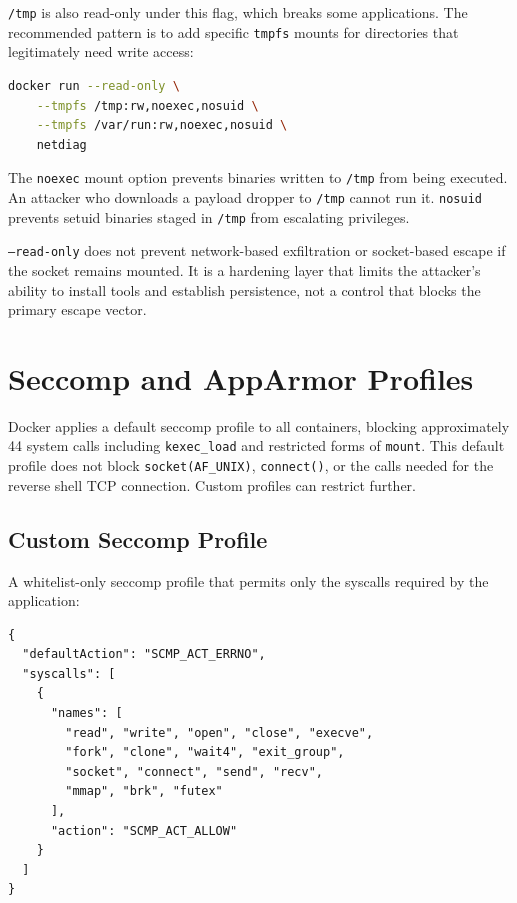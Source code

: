 \texttt{/tmp} is also read-only under this flag, which breaks some applications. The recommended pattern is to add specific \texttt{tmpfs} mounts for directories that legitimately need write access:

\begin{lstlisting}[language=bash]
docker run --read-only \
    --tmpfs /tmp:rw,noexec,nosuid \
    --tmpfs /var/run:rw,noexec,nosuid \
    netdiag
\end{lstlisting}

The \texttt{noexec} mount option prevents binaries written to \texttt{/tmp} from being executed. An attacker who downloads a payload dropper to \texttt{/tmp} cannot run it. \texttt{nosuid} prevents setuid binaries staged in \texttt{/tmp} from escalating privileges.

\texttt{--read-only} does not prevent network-based exfiltration or socket-based escape if the socket remains mounted. It is a hardening layer that limits the attacker's ability to install tools and establish persistence, not a control that blocks the primary escape vector.


\section{Seccomp and AppArmor Profiles}

Docker applies a default seccomp profile to all containers, blocking approximately 44 system calls including \texttt{kexec\_load} and restricted forms of \texttt{mount}. This default profile does not block \texttt{socket(AF\_UNIX)}, \texttt{connect()}, or the calls needed for the reverse shell TCP connection. Custom profiles can restrict further.

\subsection{Custom Seccomp Profile}

A whitelist-only seccomp profile that permits only the syscalls required by the application:

\begin{lstlisting}
{
  "defaultAction": "SCMP_ACT_ERRNO",
  "syscalls": [
    {
      "names": [
        "read", "write", "open", "close", "execve",
        "fork", "clone", "wait4", "exit_group",
        "socket", "connect", "send", "recv",
        "mmap", "brk", "futex"
      ],
      "action": "SCMP_ACT_ALLOW"
    }
  ]
}
\end{lstlisting}

